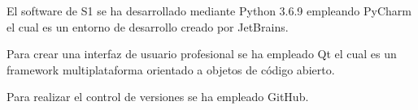 El software de \ac{S1} se ha desarrollado mediante Python 3.6.9 empleando PyCharm el cual es un entorno de desarrollo creado por JetBrains. 

Para crear una interfaz de usuario profesional se ha empleado Qt el cual es un framework multiplataforma orientado a objetos de código abierto.

Para realizar el control de versiones se ha empleado GitHub.



